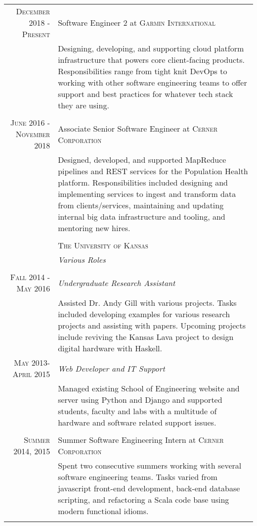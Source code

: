 \documentclass[10pt]{article} %
\begin{document}
\begin{tabular}{r|p{11cm}}
  \textsc{December 2018 - Present} & Software Engineer 2 at \textsc{Garmin International} \\
  & \footnotesize{Designing, developing, and supporting cloud platform infrastructure that powers core client-facing
    products. Responsibilities range from tight knit DevOps to working with other software engineering teams
    to offer support and best practices for whatever tech stack they are using.} \\
   \multicolumn{2}{c}{} \\
   \textsc{June 2016 - November 2018} & Associate Senior Software Engineer at \textsc{Cerner Corporation} \\
   & \footnotesize{Designed, developed, and supported MapReduce pipelines and REST services for the Population
     Health platform. Responsibilities included designing and implementing services to ingest and transform data
     from clients/services, maintaining and updating internal big data infrastructure and tooling,
     and mentoring new hires.} \\
  \multicolumn{2}{c}{} \\
& \textsc{The University of Kansas} \\
& \emph{Various Roles}\\ \\
\textsc{Fall 2014 - May 2016} & \emph{Undergraduate Research Assistant} \\
& \footnotesize{Assisted Dr. Andy Gill with various projects. Tasks included developing examples for various
research projects and assisting with papers. Upcoming projects include reviving the Kansas Lava project to
design digital hardware with Haskell.}\\
\textsc{May 2013-April 2015} & \emph{Web Developer and IT Support}\\ 
& \footnotesize{Managed existing School of Engineering website and server using Python and Django and supported students, faculty 
and labs with a multitude of hardware and software related support issues.}\\
\multicolumn{2}{c}{} \\



\textsc{Summer 2014, 2015} & Summer Software Engineering Intern at \textsc{Cerner Corporation} \\
& \footnotesize{Spent two consecutive summers working with several software engineering teams. Tasks varied from
javascript front-end development, back-end database scripting, and refactoring a Scala code base using modern functional idioms.}\\
\multicolumn{2}{c}{} \\


\end{tabular}
\end{document}
